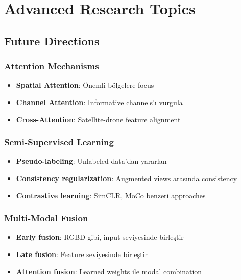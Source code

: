 \documentclass[12pt,a4paper]{article}
\begin{document}
\section{Advanced Research Topics}

\subsection{Future Directions}

\subsubsection{Attention Mechanisms}
\begin{itemize}
    \item \textbf{Spatial Attention}: Önemli bölgelere focus
    \item \textbf{Channel Attention}: Informative channels'ı vurgula
    \item \textbf{Cross-Attention}: Satellite-drone feature alignment
\end{itemize}

\subsubsection{Semi-Supervised Learning}
\begin{itemize}
    \item \textbf{Pseudo-labeling}: Unlabeled data'dan yararlan
    \item \textbf{Consistency regularization}: Augmented views arasında consistency
    \item \textbf{Contrastive learning}: SimCLR, MoCo benzeri approaches
\end{itemize}

\subsubsection{Multi-Modal Fusion}
\begin{itemize}
    \item \textbf{Early fusion}: RGBD gibi, input seviyesinde birleştir
    \item \textbf{Late fusion}: Feature seviyesinde birleştir
    \item \textbf{Attention fusion}: Learned weights ile modal combination
\end{itemize}
\end{document}
